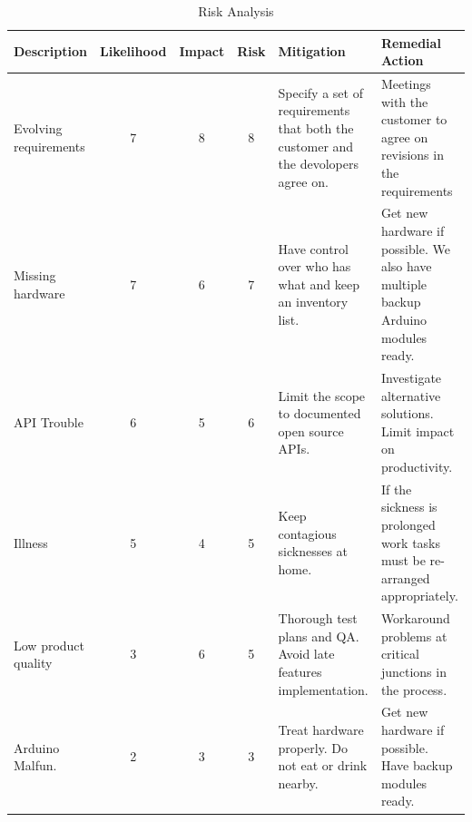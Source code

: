 \begin{table}
	\begin{center}
		\caption{Risk Analysis}
		\begin{tabular}{| p{2.1cm} | c | c | c | p{2.8cm} | p{3cm} |}
		\hline

\textbf{Description} & \textbf{Likelihood} & \textbf{Impact} & \textbf{Risk} & \textbf{Mitigation} & \textbf{Remedial Action}\\ \hline

Evolving requirements	& 7 & 8 & 8 & Specify a set of requirements that both the customer and the devolopers agree on.
				& Meetings with the customer to agree on revisions in the requirements \\ \hline

Missing hardware	& 7 & 6 & 7 & Have control over who has what and keep an inventory list.
				& Get new hardware if possible. We also have multiple backup Arduino modules ready. \\ \hline

API Trouble		& 6 & 5 & 6 & Limit the scope to documented open source APIs.
				& Investigate alternative solutions. Limit impact on productivity. \\ \hline

Illness 		& 5 & 4 & 5 & Keep contagious sicknesses at home.
				& If the sickness is prolonged work tasks must be re-arranged appropriately. \\ \hline

Low product quality	& 3 & 6 & 5 & Thorough test plans and QA. Avoid late features implementation.
				&  Workaround problems at critical junctions in the process.\\ \hline

Arduino Malfun.		& 2 & 3 & 3 & Treat hardware properly. Do not eat or drink nearby.
				&  Get new hardware if possible. Have backup modules ready. \\ \hline


			

		\end{tabular}
	\end{center}	
	\label{table:riskanalysis}
\end{table}

